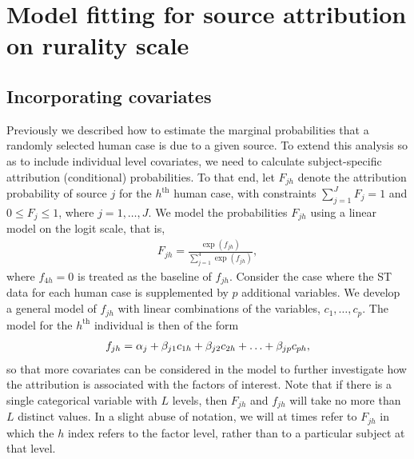 \documentclass[times, doublespace]{simauth}%
\begin{document}
\section{Model fitting for source attribution on rurality scale}

\subsection{Incorporating covariates}

Previously we described how to estimate the marginal probabilities that a randomly selected human case is due to a given source. To extend this analysis so as to include individual level covariates, we need to calculate subject-specific attribution (conditional) probabilities. To that end, let $F_{jh}$ denote the attribution probability of source $j$ for the $h^\textrm{th}$ human case, with constraints $\sum_{j=1}^J F_j =1$ and $0 \leq F_j \leq 1$, where $j=1, \ldots, J$. We model the probabilities $F_{jh}$ using a linear model on the logit scale, that is,
\begin{align}
  F_{jh}  = \frac{\exp (f_{jh})}{\sum_{j=1}^4 \exp(f_{jh})},
  \label{capF}
\end{align}
where $f_{4h}=0$ is treated as the baseline of $f_{jh}$. Consider the case where the ST data for each human case is supplemented by $p$ additional variables. We develop a general model of $f_{jh}$ with linear combinations of the variables, $c_1, \ldots, c_p$. The model for the $h^\textrm{th}$ individual is then of the form
\begin{align}
f_{jh}  = \alpha_{j} + \beta_{j1} c_{1h} + \beta_{j2} c_{2h} + \ldots + \beta_{jp} c_{ph},  \notag
\end{align}
so that more covariates can be considered in the model to further investigate how the attribution is associated with the factors of interest. Note that if there is a single categorical variable with $L$ levels, then $F_{jh}$ and $f_{jh}$ will take no more than $L$ distinct values. In a slight abuse of notation, we will at times refer to $F_{jh}$ in which the $h$ index refers to the factor level, rather than to a particular subject at that level.
\end{document}

